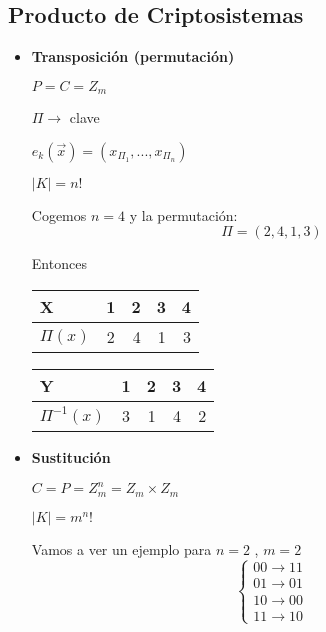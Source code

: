  \subsection{Producto de Criptosistemas}
 \begin{itemize}
 	\item \textbf{Transposición (permutación)}
 	
 	$P = C = Z_m$
 	
 	$\Pi \rightarrow $ clave
 	
 	$e_k(\overrightarrow{x}) = (x_{\Pi_1} , ... , x_{\Pi_n})$
 	
 	$|K| = n!$
 	
 	\begin{example}
 		Cogemos $n=4$ y la permutación:$$\Pi = \left(2,4,1,3\right)$$
 	
 		Entonces
 		
 		\begin{center}
 			
 			\begin{tabular}{l | c  r  r r}
 				X & 1 & 2 & 3 & 4\\
 				\hline
 				$\Pi(x)$ & 2 & 4 & 1 & 3\\
 			\end{tabular}
 		\end{center}
 		
 		\begin{center}
 			
 			\begin{tabular}{l | c  r  r r}
 				Y & 1 & 2 & 3 & 4\\
 				\hline
 				$\Pi^{-1}(x)$ & 3 & 1 & 4 & 2\\
 			\end{tabular}
 		\end{center}
 	\end{example}
 	
 	\item \textbf{Sustitución}
 	
 	$C = P = Z_m^n = Z_m \times Z_m$
 	
 	$|K| = m^n!$
 	
 	\begin{example}
 		Vamos a ver un ejemplo para $n=2$ , $m=2$
 		$$\begin{cases}
	 		00 \rightarrow 11\\
	 		01 \rightarrow 01\\
	 		10 \rightarrow 00\\
	 		11 \rightarrow 10
 		\end{cases}$$
 	\end{example}
 \end{itemize}
 
